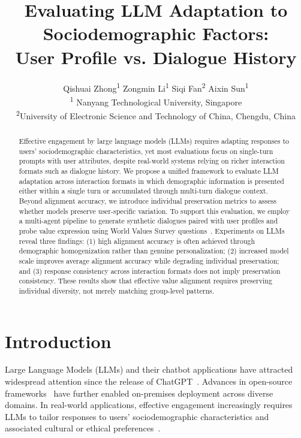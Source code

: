 \documentclass[11pt,a4paper]{article}
\title{Evaluating LLM Adaptation to Sociodemographic Factors: \\ User Profile vs. Dialogue History}
\author{
  Qishuai Zhong\textsuperscript{1} \quad
  Zongmin Li\textsuperscript{1} \quad
  Siqi Fan\textsuperscript{2} \quad
  Aixin Sun\textsuperscript{1} \\
  \textsuperscript{1} Nanyang Technological University, Singapore \\
  \textsuperscript{2}University of Electronic Science and Technology of China, Chengdu, China
}
\date{}
\begin{document}
\raggedbottom
\maketitle



\begin{abstract}
Effective engagement by large language models (LLMs) requires adapting responses to users’ sociodemographic characteristics, yet most evaluations focus on single-turn prompts with user attributes, despite real-world systems relying on richer interaction formats such as dialogue history. We propose a unified framework to evaluate LLM adaptation across interaction formats in which demographic information is presented either within a single turn or accumulated through multi-turn dialogue context. Beyond alignment accuracy, we introduce individual preservation metrics to assess whether models preserve user-specific variation. To support this evaluation, we employ a multi-agent pipeline to generate synthetic dialogues paired with user profiles and probe value expression using World Values Survey questions~\cite{Haerpfer2020-qe}. Experiments on LLMs reveal three findings: (1) high alignment accuracy is often achieved through demographic homogenization rather than genuine personalization; (2) increased model scale improves average alignment accuracy while degrading individual preservation; and (3) response consistency across interaction formats does not imply preservation consistency. These results show that effective value alignment requires preserving individual diversity, not merely matching group-level patterns.
\end{abstract}






\section{Introduction}
\label{sec:introduction}

Large Language Models (LLMs) and their chatbot applications have attracted widespread attention since the release of ChatGPT~\cite{openai2024gpt4technicalreport, dam2024completesurveyllmbasedai}. Advances in open-source frameworks~\cite{wolf2020huggingfaces, vllm} have further enabled on-premises deployment across diverse domains. In real-world applications, effective engagement increasingly requires LLMs to tailor responses to users’ sociodemographic characteristics and associated cultural or ethical preferences~\cite{sicilia2024humbelhumanintheloopapproachevaluating, altenburger2024examiningrolerelationshipalignment}.
\end{document}
